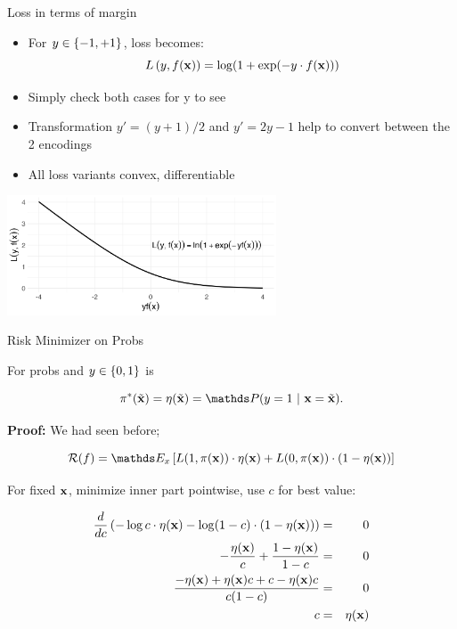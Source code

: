 \documentclass[11pt,compress,t,notes=noshow, xcolor=table]{beamer}
\begin{document}
\begin{vbframe}{Loss in terms of margin}

\begin{itemize}
\item For $y \in \{-1, +1\}$, loss becomes: 
$$
  L\left(y, f(\mathbf{x})\right) = \log(1+\exp(-y \cdot f(\mathbf{x}))) 
$$
 \item Simply check both cases for y to see
 \item Transformation $y'=(y+1)/2$ and $y'=2y-1$ help to convert between the 2 encodings
 \item All loss variants convex, differentiable
\end{itemize}

\begin{center}
\includegraphics[width = 8cm]{figure/bernoulli_margin.png}
\end{center}

\end{vbframe}


\begin{vbframe}{Risk Minimizer on Probs}

For probs and $y \in \{0, 1\}$ is

$$
  \piastxtil = \eta(\xtil) = \P(y = 1 ~|~ \xv = \xtil). 
$$

\textbf{Proof:} We had seen before;

$$
  \riskf = \E_x \left[L(1, \pix) \cdot \eta(\xv) + L(0, \pix) \cdot (1 - \eta(\xv)) \right]
$$

\vfill


For fixed $\mathbf{x}$, minimize inner part pointwise, use $c$ for best value:

\begin{footnotesize}
\begin{eqnarray*}
  \frac{d }{d c} \left(- \log c  \cdot \eta(\mathbf{x})- \log (1 - c) \cdot (1 - \eta(\mathbf{x}))\right) &=& 0 \\
  - \frac{\eta(\mathbf{x})}{c} + \frac{1 - \eta(\mathbf{x})}{1 - c} &=& 0 \\
  \frac{- \eta(\mathbf{x}) + \eta(\mathbf{x}) c + c - \eta(\mathbf{x}) c}{c (1 - c)} &=& 0 \\
  c &=& \eta(\mathbf{x})
\end{eqnarray*}
\end{footnotesize}

\end{vbframe}
\end{document}

